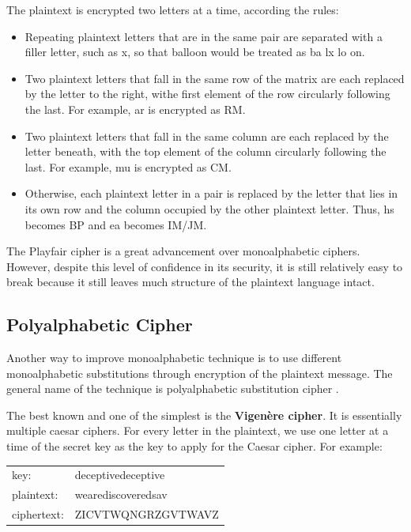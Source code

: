 \documentclass{article}
\begin{document}
The plaintext is encrypted two letters at a time, according the rules:
\begin{itemize}
\item Repeating plaintext letters that are in the same pair are separated with a filler letter, such as x, so that balloon would be treated as ba lx lo on.
\item Two plaintext letters that fall in the same row of the matrix are each replaced by the letter to the right, withe first element of the row circularly following the last. For example, ar is encrypted as RM.
\item Two plaintext letters that fall in the same column are each replaced by the letter beneath, with the top element of the column circularly following the last. For example, mu is encrypted as CM.
\item Otherwise, each plaintext letter in a pair is replaced by the letter that lies in its own row and the column occupied by the other plaintext letter. Thus, hs becomes BP and ea becomes IM/JM.
\end{itemize}

The Playfair cipher is a great advancement over monoalphabetic ciphers. However, despite this level of confidence in its security, it is still relatively easy to break because it still leaves much structure of the plaintext language intact.

\subsection{Polyalphabetic Cipher}
Another way to improve monoalphabetic technique is to use different monoalphabetic substitutions through encryption of the plaintext message. The general name of the technique is polyalphabetic substitution cipher \cite{stallings2011}.

The best known and one of the simplest is the \textbf{Vigen\`{e}re cipher}. It is essentially multiple caesar ciphers. For every letter in the plaintext, we use one letter at a time of the secret key as the key to apply for the Caesar cipher. For example:
\\

\begin{tabular}{l l}
key: & deceptivedeceptive\\
plaintext: & wearediscoveredsav\\
ciphertext: & ZICVTWQNGRZGVTWAVZ\\
\end{tabular}
\\
\end{document}
